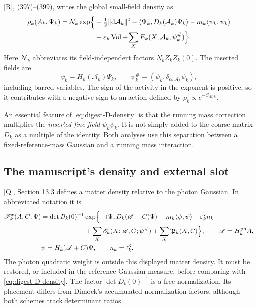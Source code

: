 \documentclass[11pt]{article}
\numberwithin{equation}{section}
\newcommand{\dd}{\mathrm d}
\newcommand{\Vol}{\operatorname{Vol}}
\newcommand{\Q}{\textup{[Q]}}
\newcommand{\UR}{\textup{[R]}}
\begin{document}
\UR, (397)--(399), writes the global small-field density as
\begin{equation}
 \begin{aligned}
 \rho_k(A_k,\Psi_k)=\mathcal N_k\exp\Bigl\{
   &-\tfrac12\|\dd\mathcal A_k\|^2
    -\langle\bar\Psi_k,D_k(\mathcal A_k)\Psi_k\rangle
    -m_k\langle\bar\psi_k,\psi_k\rangle\\
   &-\varepsilon_k\Vol
    +\sum_X E_k(X,\mathcal A_k,\psi_k^\#)\Bigr\}.
 \end{aligned}
 \label{eq:digest-D-density}
\end{equation}
Here $\mathcal N_k$ abbreviates its field-independent factors
$N_kZ_kZ_k(0)$. The inserted fields are
\[
 \psi_k=H_k(\mathcal A_k)\Psi_k,\qquad
 \psi_k^\#=(\psi_k,\delta_{\alpha,\mathcal A_k}\psi_k),
\]
including barred variables. The sign of the activity in the exponent is positive,
so it contributes with a negative sign to an action defined by
$\rho_k\propto e^{-S_{\mathrm{eff},k}}$.

An essential feature of \eqref{eq:digest-D-density} is that the running
mass correction multiplies the \emph{inserted fine field}
$\bar\psi_k\psi_k$. It is not simply added to the coarse matrix
$D_k$ as a multiple of the identity. Both analyses use this
separation between a fixed-reference-mass Gaussian and a running
mass interaction.

\subsection{The manuscript's density and external slot}

\Q, Section 13.3 defines a matter density relative to the photon
Gaussian. In abbreviated notation it is
\begin{align}
 \mathscr F_k^x(A,C;\Psi)
 &=\det D_k(0)^{-1}\exp\Bigl\{
      -\langle\bar\Psi,D_k(\mathscr A+C)\Psi\rangle
      -m_k\langle\bar\psi,\psi\rangle
      -\varepsilon_k^{\mathrm v}n_k\notag\\
 &\hspace{23mm}
      +\sum_X\mathscr E_k(X;\mathscr A,C;\psi^\#)
      +\sum_X\mathfrak P_k(X,C)\Bigr\},\qquad
      \mathscr A=H_k^{\mathrm{ph}}A,
 \label{eq:digest-Q-density}\\
 &\psi=H_k(\mathscr A+C)\Psi,\qquad n_k=\ell_k^3.\notag
\end{align}
The photon quadratic weight is outside this displayed matter
density. It must be restored, or included in the reference Gaussian
measure, before comparing with \eqref{eq:digest-D-density}.
The factor $\det D_k(0)^{-1}$ is a free normalization. Its placement
differs from Dimock's accumulated normalization factors, although
both schemes track determinant ratios.
\end{document}
